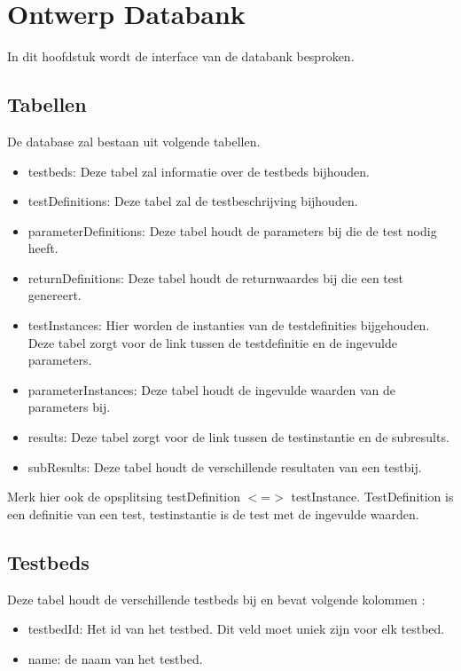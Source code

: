 \newpage
\chapter{Ontwerp Databank}
In dit hoofdstuk wordt de interface van de databank besproken.

\section{Tabellen}
De database zal bestaan uit volgende tabellen.
\begin{itemize}
\item testbeds: Deze tabel zal informatie over de testbeds bijhouden.

\item testDefinitions: Deze tabel zal de testbeschrijving bijhouden.
\item parameterDefinitions: Deze tabel houdt de parameters bij die de test nodig heeft.
\item returnDefinitions: Deze tabel houdt de returnwaardes bij die een test genereert.

\item testInstances: Hier worden de instanties van de testdefinities bijgehouden. Deze tabel zorgt voor de link tussen de testdefinitie en de ingevulde parameters.
\item parameterInstances: Deze tabel houdt de ingevulde waarden van de parameters bij.

\item results: Deze tabel zorgt voor de link tussen de testinstantie en de subresults.
\item subResults: Deze tabel houdt de verschillende resultaten van een testbij.
\end{itemize}

Merk hier ook de opsplitsing testDefinition $<$=$>$ testInstance. TestDefinition is een definitie van een test, testinstantie is de test met de ingevulde waarden.

\section{Testbeds}
Deze tabel houdt de verschillende testbeds bij en bevat volgende kolommen :
\begin{itemize}
\item testbedId: Het id van het testbed. Dit veld moet uniek zijn voor elk testbed.
\item name: de naam van het testbed.
\end{itemize}

